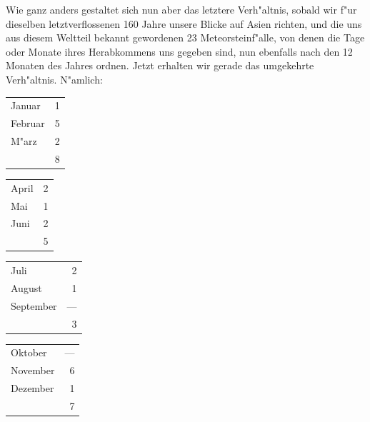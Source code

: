 \documentclass[a4paper, 8pt, oneside, polutonikogreek, german]{article}
\begin{document}
Wie ganz anders gestaltet sich nun aber das letztere Verh"altnis, sobald wir f"ur dieselben letztverflossenen 160 Jahre unsere Blicke auf Asien richten, und die uns aus diesem Weltteil bekannt gewordenen 23 Meteorsteinf"alle, von denen die Tage oder Monate ihres Herabkommens uns gegeben sind, nun ebenfalls nach den 12 Monaten des Jahres ordnen. Jetzt erhalten wir gerade das umgekehrte Verh"altnis. N"amlich:
\begin{table}[H]
    \centering\bfseries\large
    \begin{longtable}{l r}
        Januar & 1 \\
        Februar & 5 \\
        M"arz & 2 \\ \hline
        ~ & 8 \\
    \end{longtable}
\end{table}
\begin{table}[H]
    \centering\bfseries\large
    \begin{longtable}{l r}
        April & 2 \\
        Mai & 1 \\
        Juni & 2 \\ \hline
        ~ & 5 \\
    \end{longtable}
\end{table}
\begin{table}[H]
    \centering\bfseries\large
    \begin{longtable}{l r}
        Juli & 2 \\
        August & 1 \\
        September & --- \\ \hline
        ~ & 3 \\
    \end{longtable}
\end{table}
\begin{table}[H]
    \centering\bfseries\large
    \begin{longtable}{l r}
        Oktober & --- \\
        November & 6 \\
        Dezember & 1 \\ \hline
        ~ & 7 \\
    \end{longtable}
\end{table}
\end{document}
